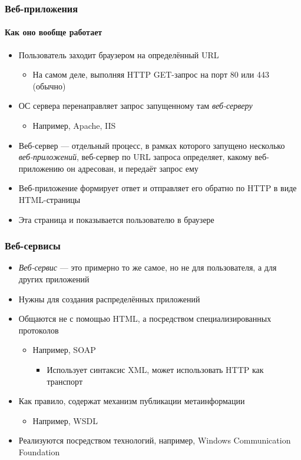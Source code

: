 \documentclass[xetex,mathserif,serif]{beamer}
\begin{document}
    \begin{frame}
        \frametitle{Веб-приложения}
        \framesubtitle{Как оно вообще работает}
        \begin{itemize}
            \item Пользователь заходит браузером на определённый URL
            \begin{itemize}
                \item На самом деле, выполняя HTTP GET-запрос на порт 80 или 443 (обычно)
            \end{itemize}
            \item ОС сервера перенаправляет запрос запущенному там \textit{веб-серверу}
            \begin{itemize}
                \item Например, Apache, IIS
            \end{itemize}
            \item Веб-сервер --- отдельный процесс, в рамках которого запущено несколько \textit{веб-приложений}, веб-сервер по URL запроса определяет, какому веб-приложению он адресован, и передаёт запрос ему
            \item Веб-приложение формирует ответ и отправляет его обратно по HTTP в виде HTML-страницы
            \item Эта страница и показывается пользователю в браузере
        \end{itemize}
    \end{frame}

    \begin{frame}
        \frametitle{Веб-сервисы}
        \begin{itemize}
            \item \textit{Веб-сервис} --- это примерно то же самое, но не для пользователя, а для других приложений
            \item Нужны для создания распределённых приложений
            \item Общаются не с помощью HTML, а посредством специализированных протоколов
            \begin{itemize}
                \item Например, SOAP 
                \begin{itemize}
                    \item Использует синтаксис XML, может использовать HTTP как транспорт
                \end{itemize}
            \end{itemize}
            \item Как правило, содержат механизм публикации метаинформации
            \begin{itemize}
                \item Например, WSDL
            \end{itemize}
            \item Реализуются посредством технологий, например, Windows Communication Foundation
        \end{itemize}
    \end{frame}
\end{document}
